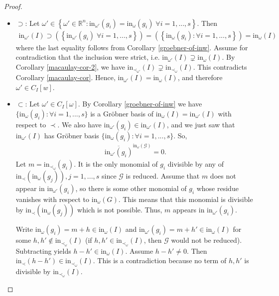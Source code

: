 \documentclass[a4paper, 11pt]{article}
\begin{document}
\begin{proof}\(  \)

  \begin{itemize}
    \item \( \supset \): Let \( \omega' \in \left\{ \omega' \in \mathbb R^n : \mathrm{in}_{\omega'}(g_i) = \mathrm{in}_\omega(g_i) \; \forall i = 1,..., s \right\} \). Then 
    \begin{align*}
      \mathrm{in}_{\omega'}(I) \supset (\left\{  \mathrm{in}_{\omega'}(g_i) \; \forall i = 1,..., s \right\}) = (\left\{  \mathrm{in}_{\omega}(g_i) : \forall i = 1,..., s \right\} ) = \mathrm{in}_\omega(I)
    \end{align*}
    where the last equality follows from Corollary \ref{groebner-of-inw}. Assume for contradiction that the inclusion were strict, i.e. \( \mathrm{in}_{\omega '}(I) \supsetneq \mathrm{in}_{\omega}(I) \). By Corollary \ref{macaulay-cor-2}, we have \( \mathrm{in}_{\prec_{\omega'}}(I) \supsetneq \mathrm{in}_{\prec_\omega}(I)\). This contradicts Corollary \ref{macaulay-cor}. Hence, \( \mathrm{in}_{\omega '}(I) = \mathrm{in}_{\omega}(I)  \), and therefore \( \omega' \in C_I[w] \).

    \item \( \subset \): Let \( \omega' \in C_I[\omega] \). By Corollary \ref{groebner-of-inw} we have \( \{ \mathrm{in}_{\omega}(g_i) : \forall i = 1,..., s \} \) is a Gröbner basis of \( \mathrm{in}_\omega(I) = \mathrm{in}_{\omega ' }(I) \) with respect to \( \prec \). We also have \( \mathrm{in}_{\omega'}(g_i) \in \mathrm{in}_{\omega'}(I) \), and we just saw that \( \mathrm{in}_{\omega'}(I) \) has Gröbner basis \( \{ \mathrm{in}_{\omega}(g_i) : \forall i = 1,..., s \} \). So,   
    \begin{align*}
      \overline{\mathrm{in}_{\omega '}(g_i)}^{\mathrm{in}_\omega(\mathcal{G})} = 0.
    \end{align*}
    Let \( m = \mathrm{in}_{\prec_\omega}(g_i) \). It is the only monomial of \( g_i \) divisible by any of \( \mathrm{in}_\prec(\mathrm{in}_\omega(g_j)), j = 1, ... , s \) since \( \mathcal{G} \) is reduced. Assume that \( m \) does not appear in \( \mathrm{in}_{\omega'}(g_i) \), so there is some other monomial of \( g_i \) whose residue vanishes with respect to \( \mathrm{in}_\omega(G) \). This means that this monomial is divisible by \( \mathrm{in}_\prec(\mathrm{in}_\omega (g_j)) \) which is not possible. Thus, \( m \) appears in \( \mathrm{in}_{\omega'}(g_i) \).

    Write \( \mathrm{in}_{\omega}(g_i) = m + h\in \mathrm{in}_\omega( I ) \) and  \( \mathrm{in}_{\omega'}(g_i) = m + h' \in \mathrm{in}_\omega( I ) \) for some \( h, h' \notin \mathrm{in}_{\prec_\omega}(I) \) (if \( h, h' \in  \mathrm{in}_{\prec_\omega}(I) \), then \( \mathcal{G} \) would not be reduced). Subtracting yields \( h - h ' \in \mathrm{in}_\omega( I )\). Assume \( h - h' \neq 0 \). Then \( \mathrm{in}_\prec(h - h') \in \mathrm{in}_{\prec_\omega}(I) \). This is a contradiction because no term of \( h, h' \) is divisible by \( \mathrm{in}_{\prec_\omega}(I) \).


\end{itemize}
\end{proof}
\end{document}
